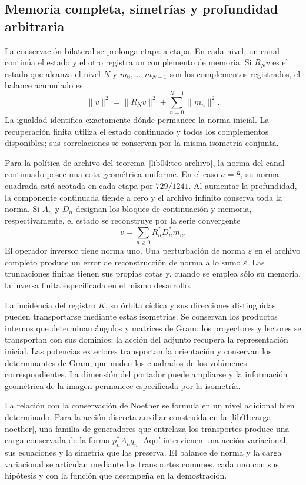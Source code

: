 \subsection*{Memoria completa, simetrías y profundidad arbitraria}
\label{libnar:memoria}

La conservación bilateral se prolonga etapa a etapa. En cada nivel,
un canal continúa el estado y el otro registra un complemento de
memoria. Si \(R_Nv\) es el estado que alcanza el nivel \(N\) y
\(m_0,\ldots,m_{N-1}\) son los complementos registrados, el
balance acumulado es
\[
 \|v\|^2=\|R_Nv\|^2+\sum_{n=0}^{N-1}\|m_n\|^2.
\]
La igualdad identifica exactamente dónde permanece la norma
inicial. La recuperación finita utiliza el estado continuado y
todos los complementos disponibles; sus correlaciones se conservan
por la misma isometría conjunta.

Para la política de archivo del teorema~\ref{lib04:teo-archivo}, la
norma del canal continuado posee una cota geométrica uniforme.
En el caso \(a=8\), su norma cuadrada está acotada en cada etapa
por \(729/1241\). Al aumentar la profundidad, la componente
continuada tiende a cero y el archivo infinito conserva toda la
norma. Si \(A_n\) y \(D_n\) designan los bloques de
continuación y memoria, respectivamente, el estado se reconstruye
por la serie convergente
\[
 v=\sum_{n\geq0}R_n^*D_n^*m_n.
\]
El operador inversor tiene norma uno. Una perturbación de norma
\(\varepsilon\) en el archivo completo produce un error de
reconstrucción de norma a lo sumo \(\varepsilon\). Las
truncaciones finitas tienen sus propias cotas y, cuando se emplea
sólo su memoria, la inversa finita especificada en el mismo
desarrollo.

La incidencia del registro \(K\), su órbita cíclica y sus
direcciones distinguidas pueden transportarse mediante estas
isometrías. Se conservan los productos internos que determinan
ángulos y matrices de Gram; los proyectores y lectores se
transportan con sus dominios; la acción del adjunto recupera la
representación inicial. Las potencias exteriores transportan la
orientación y conservan los determinantes de Gram, que miden los
cuadrados de los volúmenes correspondientes. La dimensión del
portador puede ampliarse y la información geométrica de la
imagen permanece especificada por la isometría.

La relación con la conservación de Noether se formula en un nivel
adicional bien determinado. Para la acción discreta auxiliar
construida en la \cref{lib01:carga-noether}, una familia de
generadores que entrelaza los transportes produce una carga
conservada de la forma \(p_n^*A_nq_n\). Aquí intervienen una
acción variacional, sus ecuaciones y la simetría que las preserva.
El balance de norma y la carga variacional se articulan mediante
los transportes comunes, cada uno con sus hipótesis y con la
función que desempeña en la demostración.

